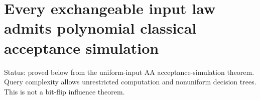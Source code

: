 \section{Every exchangeable input law admits polynomial classical
acceptance simulation}\label{proof:exchangeable_queries}

Status: proved below from the uniform-input AA acceptance-simulation
theorem. Query complexity allows unrestricted computation and nonuniform
decision trees. This is not a bit-flip influence theorem.









